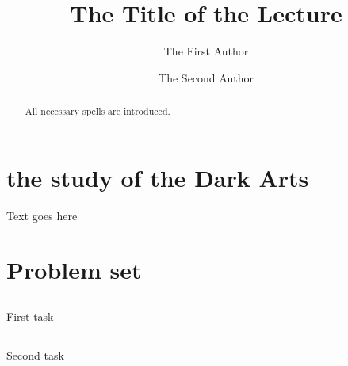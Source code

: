 \documentclass{lectureNotes}
\author{The First Author \and The Second Author}
\title{The Title of the Lecture}
\begin{document}
\begin{abstract}
All necessary spells are introduced.
\end{abstract}

\maketitle

\section{the study of the Dark Arts}
Text goes here


\section{Problem set}
\subsection{}
First task
\subsection{}
Second task
\end{document}
